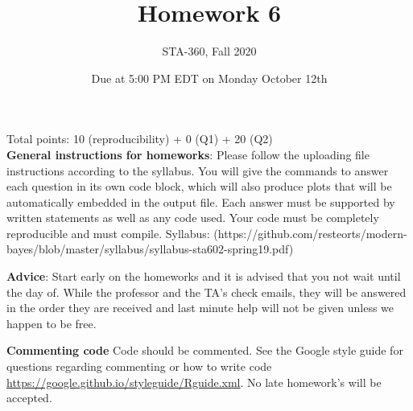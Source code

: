 \documentclass{article}
\begin{document}
\title{Homework 6}
\author{STA-360, Fall 2020}
\date{Due at 5:00 PM EDT on Monday October 12th}
\maketitle

Total points: 10 (reproducibility) + 0 (Q1) + 20 (Q2)\\

\textbf{General instructions for homeworks}: Please follow the uploading file instructions according to the syllabus. You will give the commands to answer each question in its own code block, which will also produce plots that will be automatically embedded in the output file. Each answer must be supported by written statements as well as any code used. Your code must be completely reproducible and must compile. Syllabus: (https://github.com/resteorts/modern-bayes/blob/master/syllabus/syllabus-sta602-spring19.pdf)

\textbf{Advice}: Start early on the homeworks and it is advised that you not wait until the day of. While the professor and the TA's check emails, they will be answered in the order they are received and last minute help will not be given unless we happen to be free.  

\textbf{Commenting code}
Code should be commented. See the Google style guide for questions regarding commenting or how to write 
code \url{https://google.github.io/styleguide/Rguide.xml}. No late homework's will be accepted.
\end{document}
